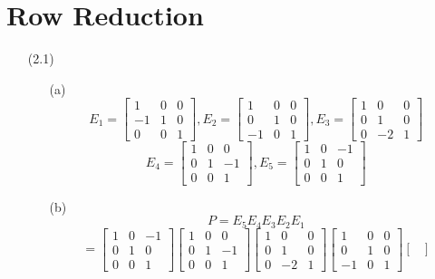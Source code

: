 \documentclass[openany]{book}
\begin{document}
\section{Row Reduction}
\begin{itemize}
\item[(2.1)]
\begin{itemize}
\item[(a)]
$$E_1 = \begin{bmatrix}
1 & 0 & 0 \\
-1 & 1 & 0 \\
0 & 0 & 1
\end{bmatrix}, E_2 = \begin{bmatrix}
1 & 0 & 0 \\
0 & 1 & 0 \\
-1 & 0 & 1
\end{bmatrix}, E_3 = \begin{bmatrix}
1 & 0 & 0 \\
0 & 1 & 0 \\
0 & -2 & 1
\end{bmatrix}$$
$$E_4 = \begin{bmatrix}
1 & 0 & 0 \\
0 & 1 & -1 \\
0 & 0 & 1
\end{bmatrix}, E_5 = \begin{bmatrix}
1 & 0 & -1 \\
0 & 1 & 0 \\
0 & 0 & 1
\end{bmatrix}$$
\item[(b)]
$$P = E_5E_4E_3E_2E_1$$
$$= \begin{bmatrix}
1 & 0 & -1 \\
0 & 1 & 0 \\
0 & 0 & 1
\end{bmatrix}\begin{bmatrix}
1 & 0 & 0 \\
0 & 1 & -1 \\
0 & 0 & 1
\end{bmatrix}\begin{bmatrix}
1 & 0 & 0 \\
0 & 1 & 0 \\
0 & -2 & 1
\end{bmatrix}\begin{bmatrix}
1 & 0 & 0 \\
0 & 1 & 0 \\
-1 & 0 & 1
\end{bmatrix}\begin{bmatrix}

\end{bmatrix}$$
\end{itemize}
\end{itemize}
\end{document}
